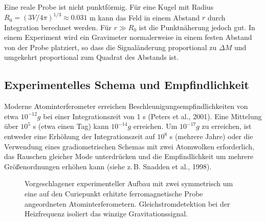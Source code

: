 \documentclass[12pt]{article}
\theoremstyle{remark}
\begin{document}
	Eine reale Probe ist nicht punktförmig. Für eine Kugel mit Radius $R_0 = (3V/4\pi)^{1/3} \approx 0.031$ m kann das Feld in einem Abstand $r$ durch Integration berechnet werden. Für $r \gg R_0$ ist die Punktnäherung jedoch gut. In einem Experiment wird ein Gravimeter normalerweise in einem festen Abstand von der Probe platziert, so dass die Signaländerung proportional zu $\Delta M$ und umgekehrt proportional zum Quadrat des Abstands ist.
	
	\subsection{Experimentelles Schema und Empfindlichkeit}
	\label{subsec:lab-scheme}
	
	Moderne Atominterferometer erreichen Beschleunigungsempfindlichkeiten von etwa $10^{-12}g$ bei einer Integrationszeit von 1 s (Peters et al., 2001). Eine Mittelung über $10^5$ s (etwa einen Tag) kann $10^{-14}g$ erreichen. Um $10^{-17}g$ zu erreichen, ist entweder eine Erhöhung der Integrationszeit auf $10^8$ s (mehrere Jahre) oder die Verwendung eines gradiometrischen Schemas mit zwei Atomwolken erforderlich, das Rauschen gleicher Mode unterdrücken und die Empfindlichkeit um mehrere Größenordnungen erhöhen kann (siehe z. B. Snadden et al., 1998).
	
	\begin{figure}[htbp]
		\centering
		\caption{Vorgeschlagener experimenteller Aufbau mit zwei symmetrisch um eine auf den Curiepunkt erhitzte ferromagnetische Probe angeordneten Atominterferometern. Gleichstromdetektion bei der Heizfrequenz isoliert das winzige Gravitationssignal.}
		\label{fig:lab-setup}
	\end{figure}
	
\end{document}
